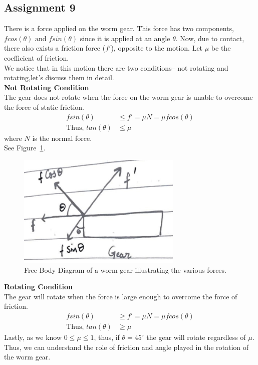 \documentclass[12pt,a4paper]{report}
\begin{document}
\subsection{\textbf{Assignment 9}}
There is a force applied on the worm gear. This force has two components, \(f cos(\theta) \text{ and } f sin(\theta)\) since 
it is applied at an angle \(\theta\). Now, due to contact, there also exists a friction force (\(f'\)), opposite to the 
motion. Let \(\mu\) be the coefficient of friction. \\
We notice that in this motion there are two conditions-- not rotating and rotating,let's discuss them in detail. \\
\textbf{Not Rotating Condition}\\
The gear does not rotate when the force on the worm gear is unable to overcome the force of static friction. 
\begin{align}
    f sin(\theta) &\leq f' = \mu N = \mu f cos(\theta)\\
    \text{Thus, } tan(\theta) &\leq \mu 
\end{align}
where \(N\) is the normal force. \\
See Figure~\ref{fig:ass9}. \\
\begin{figure}[htbp]
            \centering
    \includegraphics[width=0.7\textwidth]{figures/ass9}
    \caption{Free Body Diagram of a worm gear illustrating the various forces.}
    \label{fig:ass9}
\end{figure}
\textbf{Rotating Condition}\\
The gear will rotate when the force is large enough to overcome the force of friction.\\ 
\begin{align}
    f sin(\theta) &\geq f' = \mu N = \mu f cos(\theta)\\
    \text{Thus, } tan(\theta) &\geq \mu 
\end{align}
Lastly, as we know \(0 \leq \mu \leq 1\), thus, if \(\theta=45^{\circ}\) the gear will rotate regardless of \(\mu\). 
Thus, we can understand the role of friction and angle played in the rotation of the worm gear. 
\end{document}

